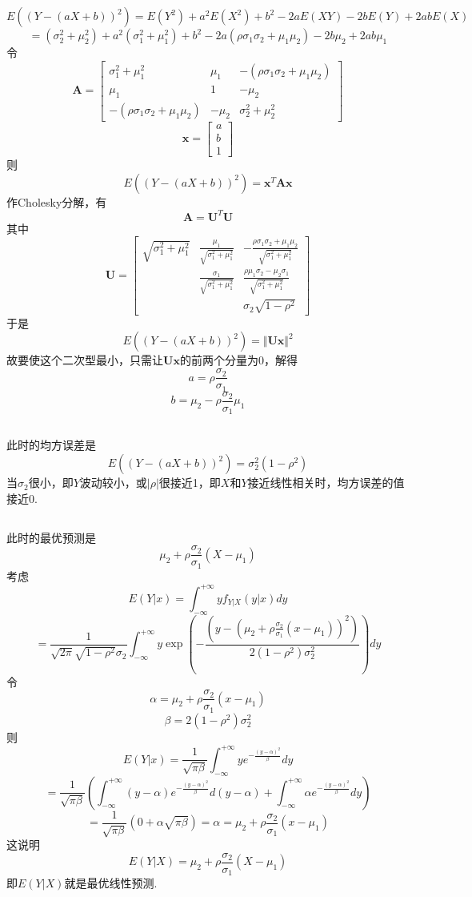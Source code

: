 \documentclass{article}
\begin{document}
\begin{CJK}{UTF8}{gbsn}
\subsection{}
$$ E((Y-(aX+b))^{2})=E(Y^{2})+a^{2}E(X^{2})+b^{2}-2aE(XY)-2bE(Y)+2abE(X)$$
$$ =(\sigma_{2}^{2}+\mu_{2}^{2})+a^{2}(\sigma_{1}^{2}+\mu_{1}^{2})+b^{2}-2a(\rho\sigma_{1}\sigma_{2}+\mu_{1}\mu_{2})-2b\mu_{2}+2ab\mu_{1}$$
令
$$ \mathbf{A}=\begin{bmatrix}\sigma_{1}^{2}+\mu_{1}^{2} & \mu_{1} & -(\rho\sigma_{1}\sigma_{2}+\mu_{1}\mu_{2}) \\
    \mu_{1} & 1 & -\mu_{2} \\
    -(\rho\sigma_{1}\sigma_{2}+\mu_{1}\mu_{2}) & -\mu_{2} & \sigma_{2}^{2}+\mu_{2}^{2}\end{bmatrix}$$
$$ \mathbf{x}=\begin{bmatrix}a \\ b \\ 1\end{bmatrix}$$
则
$$ E((Y-(aX+b))^{2})=\mathbf{x}^{T}\mathbf{A}\mathbf{x}$$
作Cholesky分解，有
$$ \mathbf{A}=\mathbf{U}^{T}\mathbf{U} $$
其中
$$ \mathbf{U}=\begin{bmatrix}
    \sqrt{\sigma_{1}^{2}+\mu_{1}^{2}} & \frac{\mu_{1}}{\sqrt{\sigma_{1}^{2}+\mu_{1}^{2}}} & -\frac{\rho\sigma_{1}\sigma_{2}+\mu_{1}\mu_{2}}{\sqrt{\sigma_{1}^{2}+\mu_{1}^{2}}}\\
    & \frac{\sigma_{1}}{\sqrt{\sigma_{1}^{2}+\mu_{1}^{2}}} & \frac{\rho\mu_{1}\sigma_{2}-\mu_{2}\sigma_{1}}{\sqrt{\sigma_{1}^{2}+\mu_{1}^{2}}}\\
    & & \sigma_{2}\sqrt{1-\rho^{2}}\end{bmatrix}$$
于是
$$ E((Y-(aX+b))^{2})=\Vert\mathbf{Ux}\Vert^{2}$$
故要使这个二次型最小，只需让$\mathbf{Ux}$的前两个分量为0，解得
$$ a=\rho\frac{\sigma_{2}}{\sigma_{1}}$$
$$ b=\mu_{2}-\rho\frac{\sigma_{2}}{\sigma_{1}}\mu_{1}$$
\subsection{}
此时的均方误差是
$$ E((Y-(aX+b))^{2})=\sigma_{2}^{2}(1-\rho^{2})$$
当$\sigma_{2}$很小，即$Y$波动较小，或$|\rho|$很接近1，即$X$和$Y$接近线性相关时，均方误差的值接近0.
\subsection{}
此时的最优预测是
$$ \mu_{2}+\rho\frac{\sigma_{2}}{\sigma_{1}}(X-\mu_{1})$$
考虑
$$ E(Y|x)=\int_{-\infty}^{+\infty}yf_{Y|X}(y|x)dy$$
$$ =\frac{1}{\sqrt{2\pi}\sqrt{1-\rho^{2}}\sigma_{2}}\int_{-\infty}^{+\infty}y\exp{(-\frac{(y-(\mu_{2}+\rho\frac{\sigma_{2}}{\sigma_{1}}(x-\mu_{1}))^{2})}{2(1-\rho^{2})\sigma_{2}^{2}})}dy$$
令
$$ \alpha=\mu_{2}+\rho\frac{\sigma_{2}}{\sigma_{1}}(x-\mu_{1})$$
$$ \beta=2(1-\rho^{2})\sigma_{2}^{2}$$
则
$$ E(Y|x)=\frac{1}{\sqrt{\pi\beta}}\int_{-\infty}^{+\infty}ye^{-\frac{(y-\alpha)^{2}}{\beta}}dy$$
$$ =\frac{1}{\sqrt{\pi\beta}}(\int_{-\infty}^{+\infty}(y-\alpha)e^{-\frac{(y-\alpha)^{2}}{\beta}}d(y-\alpha)+\int_{-\infty}^{+\infty}\alpha e^{-\frac{(y-\alpha)^{2}}{\beta}}dy)$$
$$ =\frac{1}{\sqrt{\pi\beta}}(0+\alpha\sqrt{\pi\beta})=\alpha=\mu_{2}+\rho\frac{\sigma_{2}}{\sigma_{1}}(x-\mu_{1})$$
这说明
$$ E(Y|X)=\mu_{2}+\rho\frac{\sigma_{2}}{\sigma_{1}}(X-\mu_{1})$$
即$E(Y|X)$就是最优线性预测.

\end{CJK}
\end{document}
